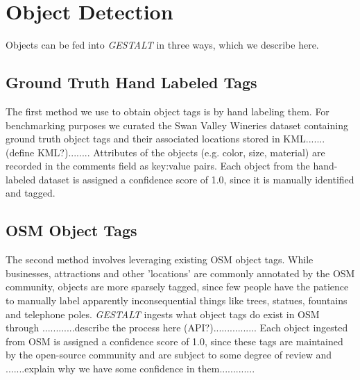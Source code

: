 \section{Object Detection}
\label{section:object}

Objects can be fed into \emph{GESTALT} in three ways, which we describe here. 

\subsection{Ground Truth Hand Labeled Tags}
The first method we use to obtain object tags is by hand labeling them. 
For benchmarking purposes we curated the Swan Valley Wineries dataset containing ground truth object tags and their associated locations stored in KML....... (define KML?)........ 
Attributes of the objects (e.g. color, size, material) are recorded in the comments field as key:value pairs.
Each object from the hand-labeled dataset is assigned a confidence score of 1.0, since it is manually identified and tagged.


\subsection{OSM Object Tags}
The second method involves leveraging existing OSM object tags.
While businesses, attractions and other 'locations' are commonly annotated by the OSM community, objects are more sparsely tagged, since few people have the patience to manually label apparently inconsequential things like trees, statues, fountains and telephone poles. 
\emph{GESTALT} ingests what object tags do exist in OSM through 
............describe the process here (API?)................
Each object ingested from OSM is assigned a confidence score of 1.0, since these tags are maintained by the open-source community and are subject to some degree of review and .......explain why we have some confidence in them.............


